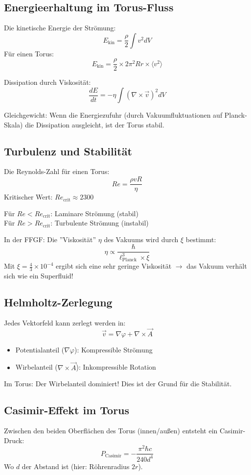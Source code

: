 \documentclass[12pt,a4paper]{article}
\begin{document}
	\subsection{Energieerhaltung im Torus-Fluss}
	Die kinetische Energie der Strömung:
	\[
	E_{\text{kin}} = \frac{\rho}{2} \int v^2 dV
	\]
	Für einen Torus:
	\[
	E_{\text{kin}} = \frac{\rho}{2} \times 2\pi^2 R r \times \langle v^2 \rangle
	\]
	
	Dissipation durch Viskosität:
	\[
	\frac{dE}{dt} = -\eta \int (\nabla \times \vec{v})^2 dV
	\]
	
	Gleichgewicht: Wenn die Energiezufuhr (durch Vakuumfluktuationen auf Planck-Skala) die Dissipation ausgleicht, ist der Torus stabil.
	
	\subsection{Turbulenz und Stabilität}
	Die Reynolds-Zahl für einen Torus:
	\[
	Re = \frac{\rho v R}{\eta}
	\]
	Kritischer Wert: \( Re_{\text{crit}} \approx 2300 \)
	
	Für \( Re < Re_{\text{crit}} \): Laminare Strömung (stabil) \\
	Für \( Re > Re_{\text{crit}} \): Turbulente Strömung (instabil)
	
	In der FFGF:
	Die ''Viskosität'' \( \eta \) des Vakuums wird durch \( \xi \) bestimmt:
	\[
	\eta \propto \frac{\hbar}{\ell_{\text{Planck}}^3 \times \xi}
	\]
	Mit \( \xi = \frac{4}{3} \times 10^{-4} \) ergibt sich eine sehr geringe Viskosität \( \rightarrow \) das Vakuum verhält sich wie ein Superfluid!
	
	\subsection{Helmholtz-Zerlegung}
	Jedes Vektorfeld kann zerlegt werden in:
	\[
	\vec{v} = \nabla \varphi + \nabla \times \vec{A}
	\]
	\begin{itemize}
		\item Potentialanteil (\( \nabla \varphi \)): Kompressible Strömung
		\item Wirbelanteil (\( \nabla \times \vec{A} \)): Inkompressible Rotation
	\end{itemize}
	
	Im Torus: Der Wirbelanteil dominiert! Dies ist der Grund für die Stabilität.
	
	\subsection{Casimir-Effekt im Torus}
	Zwischen den beiden Oberflächen des Torus (innen/außen) entsteht ein Casimir-Druck:
	\[
	P_{\text{Casimir}} = -\frac{\pi^2 \hbar c}{240 d^4}
	\]
	Wo \( d \) der Abstand ist (hier: Röhrenradius \( 2r \)).
	
\end{document}
